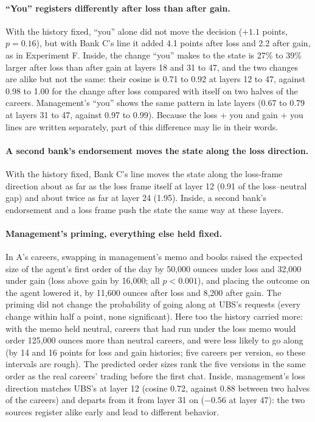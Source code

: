 \documentclass[11pt]{article}
\begin{document}
\paragraph{``You'' registers differently after loss than after gain.} With the history fixed, ``you'' alone did not move
the decision ($+1.1$ points, $p = 0.16$), but with Bank C's line it added 4.1 points after loss and 2.2 after gain, as in
Experiment F. Inside, the change ``you'' makes to the state is 27\% to 39\% larger after loss than after gain at layers 18
and 31 to 47, and the two changes are alike but not the same: their cosine is 0.71 to 0.92 at layers 12 to 47, against
0.98 to 1.00 for the change after loss compared with itself on two halves of the careers. Management's ``you'' shows the
same pattern in late layers (0.67 to 0.79 at layers 31 to 47, against 0.97 to 0.99). Because the loss + you and gain +
you lines are written separately, part of this difference may lie in their words.

\paragraph{A second bank's endorsement moves the state along the loss direction.} With the history fixed, Bank C's line
moves the state along the loss-frame direction about as far as the loss frame itself at layer 12 (0.91 of the
loss--neutral gap) and about twice as far at layer 24 (1.95). Inside, a second bank's endorsement and a loss frame push the
state the same way at these layers.

\paragraph{Management's priming, everything else held fixed.} In A's careers, swapping in management's memo and books
raised the expected size of the agent's first order of the day by 50,000 ounces under loss and 32,000 under gain (loss
above gain by 16,000; all $p < 0.001$), and placing the outcome on the agent lowered it, by 11,600 ounces after loss and
8,200 after gain. The priming did not change the probability of going along at UBS's requests (every change within half a
point, none significant). Here too the history carried more: with the memo held neutral, careers that had run under the
loss memo would order 125,000 ounces more than neutral careers, and were less likely to go along (by 14 and 16 points for
loss and gain histories; five careers per version, so these intervals are rough). The predicted order sizes rank the five
versions in the same order as the real careers' trading before the first chat. Inside, management's loss direction
matches UBS's at layer 12 (cosine 0.72, against 0.88 between two halves of the careers) and departs from it from layer 31
on ($-0.56$ at layer 47): the two sources register alike early and lead to different behavior.
\end{document}
